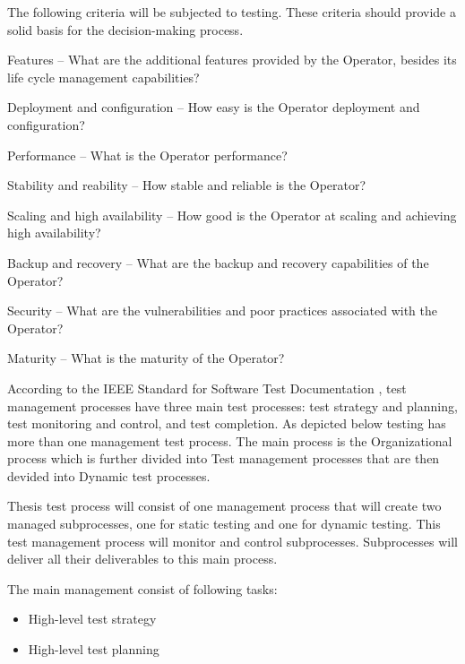 The following criteria will be subjected to testing. These criteria should provide a solid basis for the decision-making process.
\begin{criterias}
  \item	Features – What are the additional features provided by the Operator, besides its life cycle management capabilities?
  \item	Deployment and configuration – How easy is the Operator deployment and configuration?
  \item	Performance – What is the Operator performance?
  \item	Stability and reability – How stable and reliable is the Operator?
  \item	Scaling and high availability – How good is the Operator at scaling and achieving high availability?
  \item	Backup and recovery – What are the backup and recovery capabilities of the Operator?
  \item	Security – What are the vulnerabilities and poor practices associated with the Operator?
  \item	Maturity – What is the maturity of the Operator?
\end{criterias}



According to the IEEE Standard for Software Test Documentation \cite{ieeeTestProcess}, test management processes have three main test processes: test strategy and planning, test monitoring and control, and test completion.
As depicted below testing has more than one management test process. The main process is the Organizational process which is further divided into Test management processes that are then devided into Dynamic test processes.


Thesis test process will consist of one management process that will create two managed subprocesses, one for static testing and one for dynamic testing. This test management process will monitor and control subprocesses. Subprocesses will deliver all their deliverables to this main process.

The main management consist of following tasks:
\begin{itemize}
  \item High-level test strategy
  \item High-level test planning
\end{itemize}

